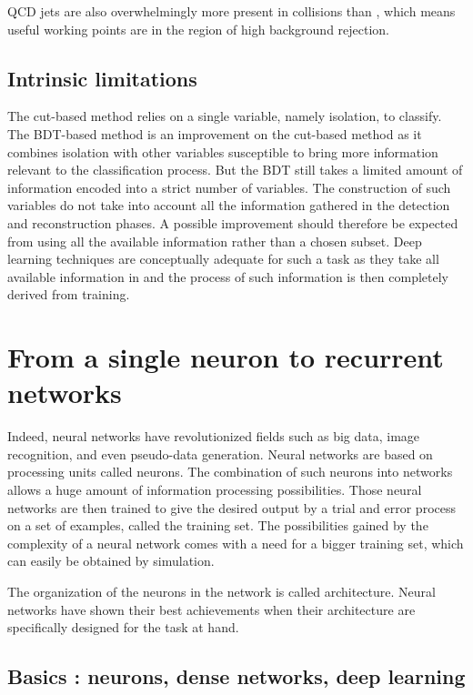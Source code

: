 QCD jets are also overwhelmingly more present in collisions than \tauh, which means useful working points are in the region of high background rejection. 

\subsection{Intrinsic limitations}

The cut-based method relies on a single variable, namely isolation, to classify. The BDT-based method is an improvement on the cut-based method as it combines isolation with other variables susceptible to bring more information relevant to the classification process. But the BDT still takes a limited amount of information encoded into a strict number of variables. The construction of such variables do not take into account all the information gathered in the detection and reconstruction phases. A possible improvement should therefore be expected from using all the available information rather than a chosen subset. Deep learning techniques are conceptually adequate for such a task as they take all available information in and the process of such information is then completely derived from training.


\section{From a single neuron to recurrent networks}
\label{sec:NN}
Indeed, neural networks have revolutionized fields such as big data, image recognition, and even pseudo-data generation.
Neural networks are based on processing units called neurons. The combination of such neurons into networks allows a huge amount of information processing possibilities. Those neural networks are then trained to give the desired output by a trial and error process on a set of examples, called the training set. The possibilities gained by the complexity of a neural network comes with a need for a bigger training set, which can easily be obtained by simulation.

The organization of the neurons in the network is called architecture. Neural networks have shown their best achievements when their architecture are specifically designed for the task at hand.

\subsection{Basics : neurons, dense networks, deep learning}

